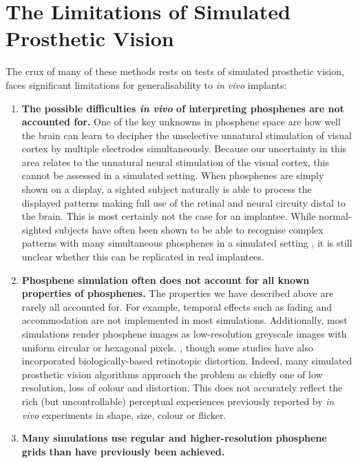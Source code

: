 \documentclass[a4paper,11pt,openany]{book}
\begin{document}
\section*{The Limitations of Simulated Prosthetic Vision}
\label{sec:orgfd5208a}

The crux of many of these methods rests on tests of simulated prosthetic vision, faces significant limitations for generalisability to \emph{in vivo} implants:

\begin{enumerate}
\item \textbf{The possible difficulties \emph{in vivo} of interpreting phosphenes are not accounted for.}
One of the key unknowns in phosphene space are how well the brain can learn to decipher the unselective unnatural stimulation of visual cortex by multiple electrodes simultaneously. \cite{beyeler_learning_2017}
Because our uncertainty in this area relates to the unnatural neural stimulation of the visual cortex, this cannot be assessed in a simulated setting.
When phosphenes are simply shown on a display, a sighted subject naturally is able to process the displayed patterns making full use of the retinal and neural circuity distal to the brain.
This is most certainly not the case for an implantee.
While normal-sighted subjects have often been shown to be able to recognise complex patterns with many simultaneous phosphenes in a simulated setting \cite{chen_simulating_2009}, it is still unclear whether this can be replicated in real implantees.
\item \textbf{Phosphene simulation often does not account for all known properties of phosphenes.}
The properties we have described above are rarely all accounted for.
For example, temporal effects such as fading and accommodation are not implemented in most simulations.
Additionally, most simulations render phosphene images as low-resolution greyscale images with uniform circular \cite{mccarthy_mobility_2014,hu_recognition_2014,sanchez-garcia_structural_2018,li_image_2018} or hexagonal pixels. \cite{chen_effect_2004}, though some studies have also incorporated biologically-based retinotopic distortion. \cite{josh_real-time_2011,josh_psychophysics_2013}
Indeed, many simulated prosthetic vision algorithms approach the problem as chiefly one of low resolution, loss of colour and distortion.
This does not accurately reflect the rich (but uncontrollable) perceptual experiences previously reported by \emph{in vivo} experiments in shape, size, colour or flicker.
\item \textbf{Many simulations use regular and higher-resolution phosphene grids than have previously been achieved.}

\end{enumerate}
\end{document}
